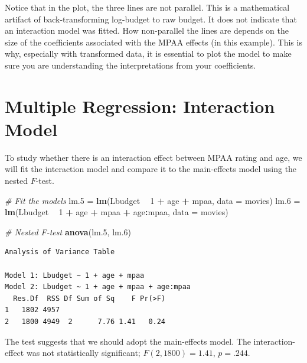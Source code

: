 \documentclass[]{book}
\newenvironment{Shaded}{\begin{snugshade}}{\end{snugshade}}
\newcommand{\CommentTok}[1]{\textcolor[rgb]{0.56,0.35,0.01}{\textit{#1}}}
\newcommand{\DataTypeTok}[1]{\textcolor[rgb]{0.13,0.29,0.53}{#1}}
\newcommand{\DecValTok}[1]{\textcolor[rgb]{0.00,0.00,0.81}{#1}}
\newcommand{\FloatTok}[1]{\textcolor[rgb]{0.00,0.00,0.81}{#1}}
\newcommand{\KeywordTok}[1]{\textcolor[rgb]{0.13,0.29,0.53}{\textbf{#1}}}
\newcommand{\NormalTok}[1]{#1}
\newcommand{\OperatorTok}[1]{\textcolor[rgb]{0.81,0.36,0.00}{\textbf{#1}}}
\newcommand{\StringTok}[1]{\textcolor[rgb]{0.31,0.60,0.02}{#1}}
\begin{document}
Notice that in the plot, the three lines are not parallel. This is a mathematical artifact of back-transforming log-budget to raw budget. It does not indicate that an interaction model was fitted. How non-parallel the lines are depends on the size of the coefficients associated with the MPAA effects (in this example). This is why, especially with transformed data, it is essential to plot the model to make sure you are understanding the interpretations from your coefficients.

\hypertarget{multiple-regression-interaction-model}{%
\section{Multiple Regression: Interaction Model}\label{multiple-regression-interaction-model}}

To study whether there is an interaction effect between MPAA rating and age, we will fit the interaction model and compare it to the main-effects model using the nested \(F\)-test.

\begin{Shaded}
\begin{Highlighting}[]
\CommentTok{# Fit the models}
\NormalTok{lm}\FloatTok{.5}\NormalTok{ =}\StringTok{ }\KeywordTok{lm}\NormalTok{(Lbudget }\OperatorTok{~}\StringTok{ }\DecValTok{1} \OperatorTok{+}\StringTok{ }\NormalTok{age }\OperatorTok{+}\StringTok{ }\NormalTok{mpaa,            }\DataTypeTok{data =}\NormalTok{ movies)}
\NormalTok{lm}\FloatTok{.6}\NormalTok{ =}\StringTok{ }\KeywordTok{lm}\NormalTok{(Lbudget }\OperatorTok{~}\StringTok{ }\DecValTok{1} \OperatorTok{+}\StringTok{ }\NormalTok{age }\OperatorTok{+}\StringTok{ }\NormalTok{mpaa }\OperatorTok{+}\StringTok{ }\NormalTok{age}\OperatorTok{:}\NormalTok{mpaa, }\DataTypeTok{data =}\NormalTok{ movies)}

\CommentTok{# Nested F-test}
\KeywordTok{anova}\NormalTok{(lm}\FloatTok{.5}\NormalTok{, lm}\FloatTok{.6}\NormalTok{)}
\end{Highlighting}
\end{Shaded}

\begin{verbatim}
Analysis of Variance Table

Model 1: Lbudget ~ 1 + age + mpaa
Model 2: Lbudget ~ 1 + age + mpaa + age:mpaa
  Res.Df  RSS Df Sum of Sq    F Pr(>F)
1   1802 4957                         
2   1800 4949  2      7.76 1.41   0.24
\end{verbatim}

The test suggests that we should adopt the main-effects model. The interaction-effect was not statistically significant; \(F(2,1800)=1.41\), \(p=.244\).
\end{document}
